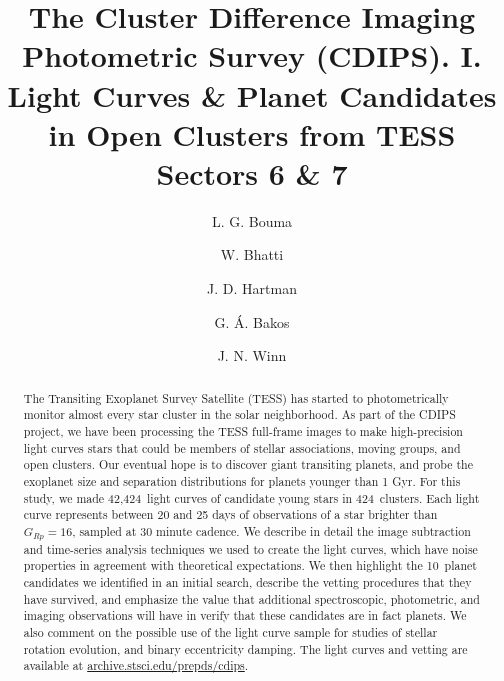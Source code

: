 \documentclass[12pt,twocolumn,tighten]{aastex62}
\newcommand{\numberpcs}{10\ }
\newcommand{\numberlcs}{42{,}424\ }
\newcommand{\numberclusters}{424\ }
\begin{document}
\title{
  The Cluster Difference Imaging Photometric Survey (CDIPS).  I.
  Light Curves \& Planet Candidates in Open Clusters from TESS Sectors 6 \& 7
}


\author[0000-0002-0514-5538]{L. G. Bouma}
%
\author[0000-0002-0628-0088]{W. Bhatti}
%
\author[0000-0001-8732-6166]{J. D. Hartman}
%
\author[0000-0001-7204-6727]{G. \'A. Bakos}
%
\author[0000-0002-4265-047X]{J. N. Winn}

\begin{abstract}
  The Transiting Exoplanet Survey Satellite (TESS) has started to
  photometrically monitor almost every star cluster in
  the solar neighborhood.
  As part of the CDIPS project, we have been processing the TESS
  full-frame images to make high-precision light curves stars that
  could be members of stellar associations, moving groups, and open clusters.
  Our eventual hope is to discover giant transiting planets, and probe
  the exoplanet size and separation distributions for planets younger
  than 1 Gyr.
  For this study, we made \numberlcs light curves of candidate young
  stars in \numberclusters clusters.
  Each light curve represents between 20 and 25 days of observations
  of a star brighter than $G_{Rp}=16$, sampled at 30 minute cadence.
  We describe in detail the image subtraction and time-series analysis 
  techniques we used to create the light curves, which
  have noise properties in agreement with theoretical expectations.
  We then highlight the \numberpcs planet candidates we identified in
  an initial search, describe the vetting procedures that they have
  survived, and emphasize the value that additional
  spectroscopic, photometric, and imaging observations will have in
  verify that these candidates are in fact planets.
  We also comment on the possible use of the light curve sample for
  studies of stellar rotation evolution, and binary eccentricity
  damping.
  The light curves and vetting are available at
  \url{archive.stsci.edu/prepds/cdips}.
\end{abstract}
\end{document}

